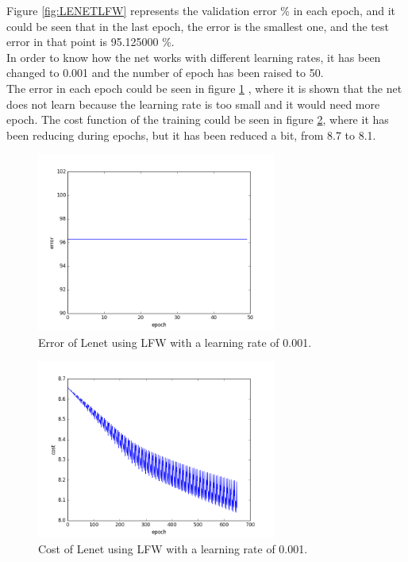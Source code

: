 Figure \ref{fig:LENETLFW} represents the validation error \% in each epoch, and it could be seen that in the last epoch, the error is the smallest one, and the test error in that point is 95.125000 \%.\\

In order to know how the net works with different learning rates, it has been changed to 0.001 and the number of epoch has been raised to 50.\\

The error in each epoch could be seen in figure \ref{fig:LENETLFWerror0-001} , where it is shown that the net does not learn because the learning rate is too small and it would need more epoch. The cost function of the training could be seen in figure \ref{fig:LENETLFWcost0-001}, where it has been reducing during epochs, but it has been reduced a bit, from 8.7 to 8.1.\\

\begin{figure}[htb]
\centering
\includegraphics[width=0.7\textwidth]{images/LFW_learningrate/error_0_001.png}
\caption{Error of Lenet using LFW with a learning rate of 0.001.} \label{fig:LENETLFWerror0-001}
\end{figure}

\begin{figure}[htb]
\centering
\includegraphics[width=0.7\textwidth]{images/LFW_learningrate/cost_0_001.png}
\caption{Cost of Lenet using LFW with a learning rate of 0.001.} \label{fig:LENETLFWcost0-001}
\end{figure}

